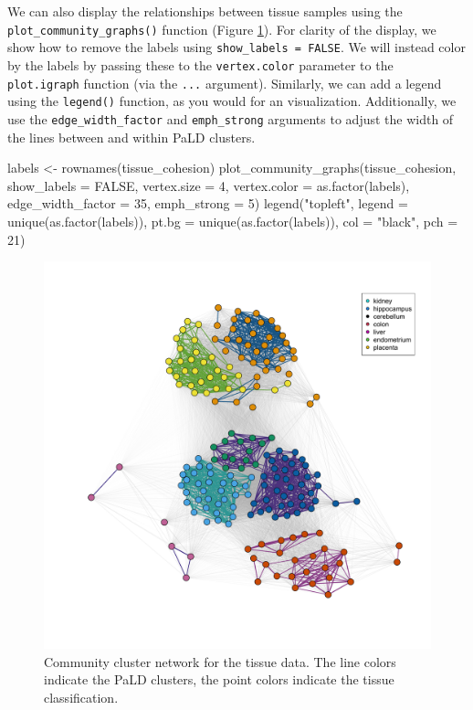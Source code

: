 We can also display the relationships between tissue samples using the
\texttt{plot\_community\_graphs()} function (Figure \ref{fig:fig4}). For
clarity of the display, we show how to remove the labels using
\texttt{show\_labels\ =\ FALSE}. We will instead color by the labels by
passing these to the \texttt{vertex.color} parameter to the
\texttt{plot.igraph} function (via the \texttt{...} argument).
Similarly, we can add a legend using the \texttt{legend()} function, as
you would for an  visualization. Additionally, we use
the \texttt{edge\_width\_factor} and \texttt{emph\_strong} arguments to
adjust the width of the lines between and within PaLD clusters.

\begin{Schunk}
\begin{Sinput}
labels <- rownames(tissue_cohesion)
plot_community_graphs(tissue_cohesion,
                      show_labels = FALSE,
                      vertex.size = 4,
                      vertex.color = as.factor(labels),
                      edge_width_factor = 35,
                      emph_strong = 5) 
legend("topleft", 
       legend = unique(as.factor(labels)), 
       pt.bg = unique(as.factor(labels)),
       col = "black",
       pch = 21)
\end{Sinput}
\end{Schunk}

\begin{Schunk}
\begin{figure}
\includegraphics[width=1\linewidth]{fig5} \caption[Community cluster network for the tissue data]{Community cluster network for the tissue data. The line colors indicate the PaLD clusters, the point colors indicate the tissue classification.}\label{fig:fig4}
\end{figure}
\end{Schunk}

